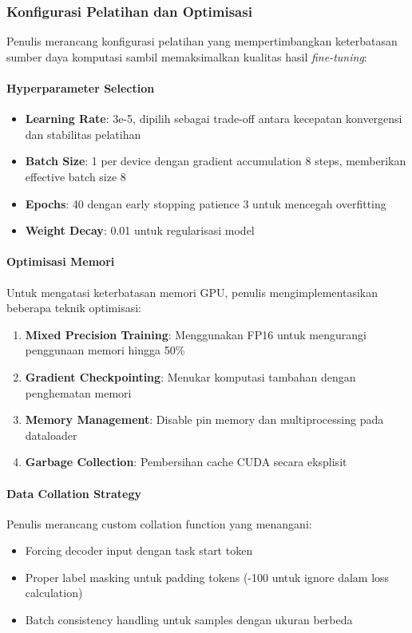 \subsubsection{Konfigurasi Pelatihan dan Optimisasi}
\label{subsubsec:konfigurasi-pelatihan}

Penulis merancang konfigurasi pelatihan yang mempertimbangkan keterbatasan sumber daya komputasi sambil memaksimalkan kualitas hasil \emph{fine-tuning}:

\paragraph{Hyperparameter Selection}
\begin{itemize}
    \item \textbf{Learning Rate}: 3e-5, dipilih sebagai trade-off antara kecepatan konvergensi dan stabilitas pelatihan
    \item \textbf{Batch Size}: 1 per device dengan gradient accumulation 8 steps, memberikan effective batch size 8
    \item \textbf{Epochs}: 40 dengan early stopping patience 3 untuk mencegah overfitting
    \item \textbf{Weight Decay}: 0.01 untuk regularisasi model
\end{itemize}

\paragraph{Optimisasi Memori}
Untuk mengatasi keterbatasan memori GPU, penulis mengimplementasikan beberapa teknik optimisasi:
\begin{enumerate}
    \item \textbf{Mixed Precision Training}: Menggunakan FP16 untuk mengurangi penggunaan memori hingga 50\%
    \item \textbf{Gradient Checkpointing}: Menukar komputasi tambahan dengan penghematan memori
    \item \textbf{Memory Management}: Disable pin memory dan multiprocessing pada dataloader
    \item \textbf{Garbage Collection}: Pembersihan cache CUDA secara eksplisit
\end{enumerate}

\paragraph{Data Collation Strategy}
Penulis merancang custom collation function yang menangani:
\begin{itemize}
    \item Forcing decoder input dengan task start token
    \item Proper label masking untuk padding tokens (-100 untuk ignore dalam loss calculation)
    \item Batch consistency handling untuk samples dengan ukuran berbeda
\end{itemize}